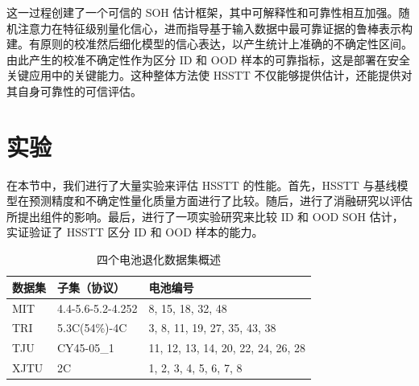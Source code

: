 \documentclass[UTF8,journal,twoside,web]{ieeecolor}
\newcommand{\newtext}[1]{{\leavevmode\color{blue}#1}}
\begin{document}
\newtext{这一过程创建了一个可信的 SOH 估计框架，其中可解释性和可靠性相互加强。随机注意力在特征级别量化信心，进而指导基于输入数据中最可靠证据的鲁棒表示构建。有原则的校准然后细化模型的信心表达，以产生统计上准确的不确定性区间。由此产生的校准不确定性作为区分 ID 和 OOD 样本的可靠指标，这是部署在安全关键应用中的关键能力。这种整体方法使 HSSTT 不仅能够提供估计，还能提供对其自身可靠性的可信评估。}

\section{实验}\label{sec:experiment}

在本节中，我们进行了大量实验来评估 HSSTT 的性能。首先，HSSTT 与基线模型在预测精度和不确定性量化质量方面进行了比较。随后，进行了消融研究以评估所提出组件的影响。最后，进行了一项实验研究来比较 ID 和 OOD SOH 估计，实证验证了 HSSTT 区分 ID 和 OOD 样本的能力。

\begin{table}[htbp]
  \centering
  \caption{四个电池退化数据集概述}\label{tab:dataset_summary}%
  \scalebox{0.8}
    {
      \small
    \begin{tabular}{llp{13.335em}}
    \toprule
    数据集 & 子集（协议） & \multicolumn{1}{l}{电池编号} \\
    \midrule
    MIT   & 4.4-5.6-5.2-4.252 & 8, 15, 18, 32, 48 \\
    TRI   & 5.3C(54\%)-4C & 3, 8, 11, 19, 27, 35, 43, 38 \\
    TJU   & CY45-05\_1 & 11, 12, 13, 14, 20, 22, 24, 26, 28 \\
    {XJTU} & {2C} & {1, 2, 3, 4, 5, 6, 7, 8} \\
    \bottomrule
    \end{tabular}%
    }
\end{table}%
\end{document}
